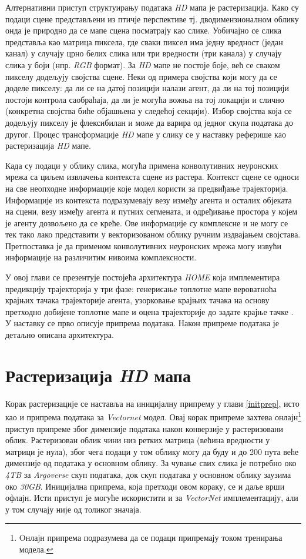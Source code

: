 \documentclass[11pt,oneside]{memoir}
\begin{document}
Алтернативни приступ структуирању података \textit{HD} мапа је растеризација. Како су подаци
сцене представљени из птичје перспективе тј. дводимензионалном облику онда је природно да се мапе сцена посматрају као слике. 
Уобичајно се слика представља као матрица пиксела, где сваки пиксел има једну вредност (један канал) у случају црно белих слика или 
три вредности (три канала) у случају слика у боји (нпр. \textit{RGB} формат). За \textit{HD}
мапе не постоје боје, већ се сваком пикселу додељују својства сцене. Неки од примера својства који могу 
да се доделе пикселу: да ли се на датој позицији налази агент,
да ли на тој позицији постоји контрола саобраћаја, да ли је могућа вожња на тој локацији и слично (конкретна својства
биће објашњена у следећој секцији). Избор својства која се додељују
пикселу је флексибилан и може да варира од једног скупа података до другог.
Процес трансформације \textit{HD} мапе у слику се у наставку реферише као растеризација \textit{HD} мапе. 

Када су подаци у облику слика, могућа примена конволутивних неуронских мрежа са циљем извлачења контекста сцене из растера. 
Контекст сцене се односи на све неопходне информације које модел користи за предвиђање трајекторија. Информације из контекста подразумевају
везу између агента и осталих објеката на сцени, везу између агента и путних сегмената, и одређивање простора у којем је агенту дозвољено да се креће.
Ове информације су комплексне и не могу се тек тако лако представити у векторизованом облику ручним издвајањем својстава. 
Претпоставка је да применом конволутивних неуронских мрежа могу извући информације на различитим нивоима комплексности. 

У овој глави се презентује постојећа архитектура \textit{HOME} која имплементира предикцију трајекторија у три фазе: 
генерисање топлотне мапе вероватноћа крајњих тачака трајекторије агента, 
узорковање крајњих тачака на основу претходно добијене топлотне мапе и оцена трајекторије до задате крајње
тачке \cite{home}. У наставку се прво описује припрема података. Након припреме података је детаљно описана архитектура.

\section{Растеризација \textit{HD} мапа}

Корак растеризације се наставља на иницијалну припрему у глави \ref{initprep}, исто као и припрема података за \textit{Vectornet} модел. 
Овај корак припреме захтева онлајн\footnote{Oнлајн припрема подразумева да се подаци припремају током тренирања модела.} 
приступ припреме због димензије података након конверзије у растеризовани облик. Растеризован облик чини
низ ретких матрица (већина вредности у матрици је нула), због чега подаци у том облику могу да буду 
и до 200 пута веће димензије од података у основном облику. За чување 
свих слика је потребно око \textit{4TB} за \textit{Argoverse} скуп података, 
док скуп података у основном облику заузима око \textit{30GB}. Иницијална
припрема, која претходи овом кораку, се и даље врши офлајн. 
Исти приступ је могуће искористити и за \textit{VectorNet} имплементацију, али у том случају није од толиког значаја. 
\end{document}
